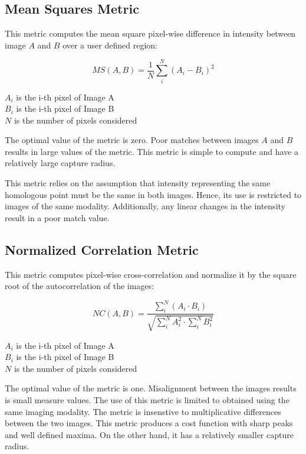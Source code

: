 \subsection{Mean Squares Metric}
\label{sec:MeanSquaresMetric}
This metric computes the mean square pixel-wise difference in intensity
between image $A$ and $B$ over a user defined region:

\begin{equation}
MS(A,B) = \frac{1}{N} \sum_i^N \left( A_i - B_i \right)^2
\end{equation}
\begin{center}
$A_i$ is the i-th pixel of Image A\\ 
$B_i$ is the i-th pixel of Image B\\
$N$ is the number of pixels considered
\end{center}

The optimal value of the metric is zero. Poor matches between images
$A$ and $B$ results in large values of the metric. This metric is
simple to compute and have a relatively large capture radius.

This metric relies on the assumption that intensity representing
the same homologous point must be the same in both images. Hence,
its use is restricted to images of the same modality. Additionally,
any linear changes in the intensity result in a poor match value.

\subsection{Normalized Correlation Metric}
\label{sec:NormalizedCorrelationMetric}
This metric computes pixel-wise cross-correlation and normalize it
by the square root of the autocorrelation of the images:

\begin{equation}
NC(A,B) = \frac{ \sum_i^N \left( A_i \cdot B_i \right) }
         { \sqrt { \sum_i^N A_i^2  \cdot \sum_i^N B_i^2 } }
\end{equation}
\begin{center}
$A_i$ is the i-th pixel of Image A\\ 
$B_i$ is the i-th pixel of Image B\\
$N$ is the number of pixels considered
\end{center}

The optimal value of the metric is one. Misalignment between the
images results is small measure values. The use of this metric
is limited to obtained using the same imaging modality. The metric
is insenstive to multiplicative differences between the two
images. This metric produces a cost function with sharp peaks and well
defined maxima. On the other hand, it has a relatively smaller
capture radius.


